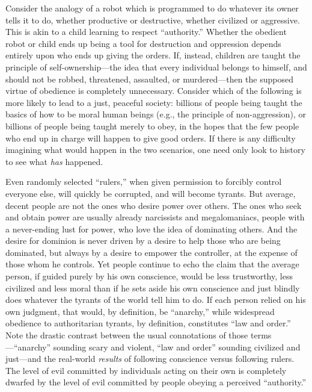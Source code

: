 \documentclass{book}
\begin{document}
Consider the analogy of a robot which is programmed to do whatever its owner tells it to do, whether productive or destructive, whether civilized or aggressive. This is akin to a child learning to respect \enquote{authority.} Whether the obedient robot or child ends up being a tool for destruction and oppression depends entirely upon who ends up giving the orders. If, instead, children are taught the principle of self-ownership---the idea that every individual belongs to himself, and should not be robbed, threatened, assaulted, or murdered---then the supposed virtue of obedience is completely unnecessary. Consider which of the following is more likely to lead to a just, peaceful society: billions of people being taught the basics of how to be moral human beings (e.g., the principle of non-aggression), or billions of people being taught merely to obey, in the hopes that the few people who end up in charge will happen to give good orders. If there is any difficulty imagining what would happen in the two scenarios, one need only look to history to see what \emph{has} happened.

Even randomly selected \enquote{rulers,} when given permission to forcibly control everyone else, will quickly be corrupted, and will become tyrants. But average, decent people are not the ones who desire power over others. The ones who seek and obtain power are usually already narcissists and megalomaniacs, people with a never-ending lust for power, who love the idea of dominating others. And the desire for dominion is never driven by a desire to help those who are being dominated, but always by a desire to empower the controller, at the expense of those whom he controls. Yet people continue to echo the claim that the average person, if guided purely by his own conscience, would be less trustworthy, less civilized and less moral than if he sets aside his own conscience and just blindly does whatever the tyrants of the world tell him to do. If each person relied on his own judgment, that would, by definition, be \enquote{anarchy,} while widespread obedience to authoritarian tyrants, by definition, constitutes \enquote{law and order.} Note the drastic contrast between the usual connotations of those terms---\enquote{anarchy} sounding scary and violent, \enquote{law and order} sounding civilized and just---and the real-world \emph{results} of following conscience versus following rulers. The level of evil committed by individuals acting on their own is completely dwarfed by the level of evil committed by people obeying a perceived \enquote{authority.}
\end{document}
